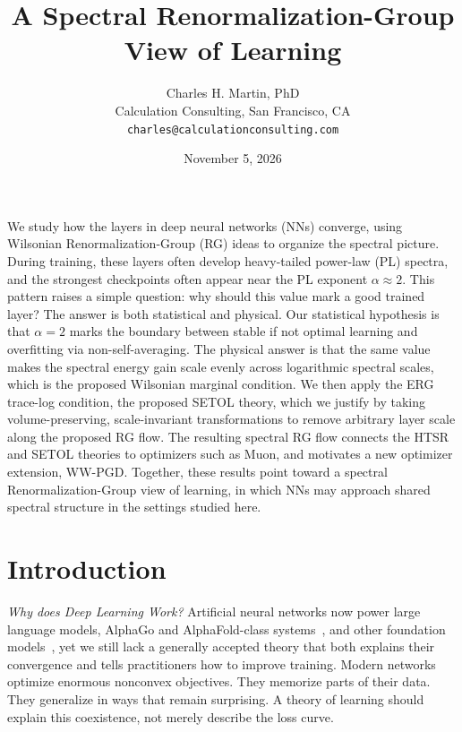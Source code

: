 \documentclass[10pt,twocolumn]{article}
\title{\bfseries A Spectral Renormalization-Group View of Learning}
\author{Charles H. Martin, PhD\\
\small Calculation Consulting, San Francisco, CA\\[-0.2em]
\small \texttt{charles@calculationconsulting.com}}
\date{November 5, 2026}
\renewenvironment{abstract}{%
  \par\vspace{-0.85em}\noindent{\bfseries\large Abstract}\par\vspace{0.35em}%
  \small\noindent
}{\par\vspace{0.8em}}
\begin{document}
\maketitle

\begin{abstract}
  We study how the layers in deep neural networks (NNs) converge, using Wilsonian Renormalization-Group (RG) ideas to organize the spectral picture.
  During training, these layers often develop heavy-tailed power-law (PL) spectra,
  and the strongest checkpoints often appear near the PL exponent $\alpha\approx 2$.
  This pattern raises a simple question: why should this value mark a good trained layer?
  The answer is both statistical and physical.
  Our statistical hypothesis is that $\alpha=2$ marks the boundary between stable if not optimal learning
  and overfitting via non-self-averaging.
  The physical answer is that the same value  makes the spectral energy gain scale evenly across
  logarithmic spectral scales, which is the proposed Wilsonian marginal condition.
  We then apply the ERG trace-log condition, the proposed SETOL theory, which we justify
  by taking  volume-preserving,  scale-invariant transformations
  to remove arbitrary layer scale along the proposed RG flow.
   The resulting spectral RG flow connects the HTSR and SETOL theories to optimizers
   such as Muon, and motivates a new optimizer extension, WW-PGD.
   Together, these results point toward a spectral Renormalization-Group view of learning,
   in which NNs may approach shared spectral structure in the settings studied here.
\end{abstract}

\section{Introduction}
\label{sxn:intro}
\enlargethispage{\baselineskip}

\emph{Why does Deep Learning Work?} Artificial neural networks now power large language models,
AlphaGo and AlphaFold-class systems~\cite{SilverAlphaGo2016,JumperAlphaFold2021},
and other foundation models~\cite{BommasaniFoundationModels2021,Qwen25TechnicalReport2025,OpenAIGPTOSS2025},
yet we still lack a generally accepted theory that both explains their convergence and tells practitioners how to improve training. Modern networks optimize enormous nonconvex objectives. They memorize parts of their data. They generalize in ways that remain surprising. A theory of learning should explain this coexistence, not merely describe the loss curve.
\end{document}
